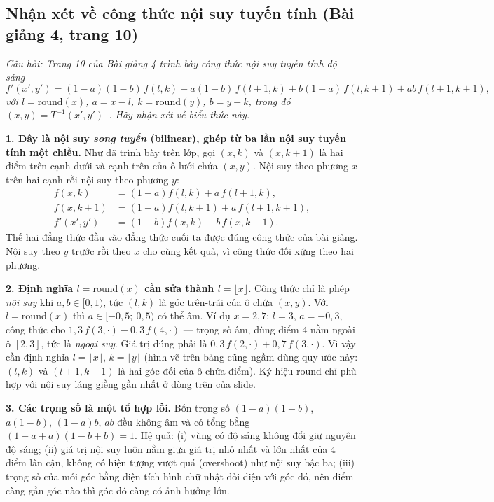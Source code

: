 \subsection{Nhận xét về công thức nội suy tuyến tính (Bài giảng 4, trang 10)}
\label{subsec:w6_linear_interp_remark}

\textit{Câu hỏi: Trang 10 của Bài giảng 4 trình bày công thức nội suy tuyến tính độ sáng
\[
f'(x', y') = (1 - a)(1 - b)\,f(l, k) + a(1 - b)\,f(l + 1, k) + b(1 - a)\,f(l, k + 1) + ab\,f(l + 1, k + 1),
\]
với $l = \mathrm{round}(x)$, $a = x - l$, $k = \mathrm{round}(y)$, $b = y - k$, trong đó $(x, y) = T^{-1}(x', y')$~\citep{xlav_lec4}. Hãy nhận xét về biểu thức này.}

\textbf{1. Đây là nội suy \emph{song tuyến} (bilinear), ghép từ ba lần nội suy tuyến tính một chiều.} Như đã trình bày trên lớp, gọi $(x, k)$ và $(x, k + 1)$ là hai điểm trên cạnh dưới và cạnh trên của ô lưới chứa $(x, y)$. Nội suy theo phương $x$ trên hai cạnh rồi nội suy theo phương $y$:
\begin{align}
f(x, k) &= (1 - a) f(l, k) + a\,f(l + 1, k), \\
f(x, k + 1) &= (1 - a) f(l, k + 1) + a\,f(l + 1, k + 1), \\
f'(x', y') &= (1 - b) f(x, k) + b\,f(x, k + 1).
\end{align}
Thế hai đẳng thức đầu vào đẳng thức cuối ta được đúng công thức của bài giảng. Nội suy theo $y$ trước rồi theo $x$ cho cùng kết quả, vì công thức đối xứng theo hai phương.

\textbf{2. Định nghĩa $l = \mathrm{round}(x)$ cần sửa thành $l = \lfloor x \rfloor$.} Công thức chỉ là phép \emph{nội suy} khi $a, b \in [0, 1)$, tức $(l, k)$ là góc trên-trái của ô chứa $(x, y)$. Với $l = \mathrm{round}(x)$ thì $a \in [-0{,}5;\ 0{,}5)$ có thể âm. Ví dụ $x = 2{,}7$: $l = 3$, $a = -0{,}3$, công thức cho $1{,}3\,f(3, \cdot) - 0{,}3\,f(4, \cdot)$ — trọng số âm, dùng điểm $4$ nằm ngoài ô $[2, 3]$, tức là \emph{ngoại suy}. Giá trị đúng phải là $0{,}3\,f(2, \cdot) + 0{,}7\,f(3, \cdot)$. Vì vậy cần định nghĩa $l = \lfloor x \rfloor$, $k = \lfloor y \rfloor$ (hình vẽ trên bảng cũng ngầm dùng quy ước này: $(l, k)$ và $(l + 1, k + 1)$ là hai góc đối của ô chứa điểm). Ký hiệu $\mathrm{round}$ chỉ phù hợp với nội suy láng giềng gần nhất ở dòng trên của slide.

\textbf{3. Các trọng số là một tổ hợp lồi.} Bốn trọng số $(1 - a)(1 - b)$, $a(1 - b)$, $(1 - a)b$, $ab$ đều không âm và có tổng bằng $(1 - a + a)(1 - b + b) = 1$. Hệ quả: (i) vùng có độ sáng không đổi giữ nguyên độ sáng; (ii) giá trị nội suy luôn nằm giữa giá trị nhỏ nhất và lớn nhất của $4$ điểm lân cận, không có hiện tượng vượt quá (overshoot) như nội suy bậc ba; (iii) trọng số của mỗi góc bằng diện tích hình chữ nhật đối diện với góc đó, nên điểm càng gần góc nào thì góc đó càng có ảnh hưởng lớn.

